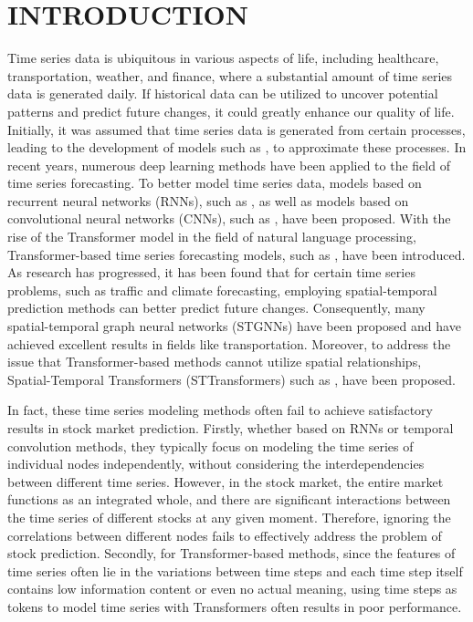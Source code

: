 

\maketitle

\section{INTRODUCTION}
Time series data is ubiquitous in various aspects of life, including healthcare, transportation, weather, and finance, where a substantial amount of time series data is generated daily. If historical data can be utilized to uncover potential patterns and predict future changes, it could greatly enhance our quality of life. Initially, it was assumed that time series data is generated from certain processes, leading to the development of models such as \citet{box_jenkins_1970}, \citet{engle1982autoregressive} to approximate these processes. In recent years, numerous deep learning methods have been applied to the field of time series forecasting. To better model time series data, models based on recurrent neural networks (RNNs), such as \citet{qin2017dual}, as well as models based on convolutional neural networks (CNNs), such as \citet{dai2022price}, have been proposed. With the rise of the Transformer model in the field of natural language processing, Transformer-based time series forecasting models, such as \citet{crossformer}, have been introduced. As research has progressed, it has been found that for certain time series problems, such as traffic and climate forecasting, employing spatial-temporal prediction methods can better predict future changes. Consequently, many spatial-temporal graph neural networks (STGNNs) have been proposed and have achieved excellent results in fields like transportation. Moreover, to address the issue that Transformer-based methods cannot utilize spatial relationships, Spatial-Temporal Transformers (STTransformers) such as \citet{TFT}, \citet{STTN} have been proposed.

In fact, these time series modeling methods often fail to achieve satisfactory results in stock market prediction. Firstly, whether based on RNNs or temporal convolution methods, they typically focus on modeling the time series of individual nodes independently, without considering the interdependencies between different time series. However, in the stock market, the entire market functions as an integrated whole, and there are significant interactions between the time series of different stocks at any given moment. Therefore, ignoring the correlations between different nodes fails to effectively address the problem of stock prediction. Secondly, for Transformer-based methods, since the features of time series often lie in the variations between time steps and each time step itself contains low information content or even no actual meaning, using time steps as tokens to model time series with Transformers often results in poor performance.


